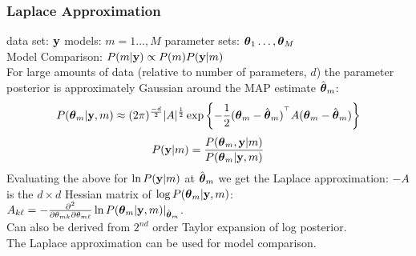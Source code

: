 \begin{frame}
\frametitle{Laplace Approximation}

\vspace*{-0.4\oin}
{\small data set: $\mathbf{y}$ \hspace{5mm} models: $m=1 \ldots,M$
\hspace{5mm} 
parameter sets: $\boldsymbol{\theta}_1 \ldots, \boldsymbol{\theta}_M$} \\

Model Comparison: \hspace{1\oin} $P(m|\mathbf{y}) \propto P(m)
P(\mathbf{y}|m) $ \\[1ex]

For large amounts of data (relative to number of parameters, $d$) the
parameter posterior is approximately Gaussian around the MAP estimate
$\hat{\boldsymbol{\theta}}_m$: 
\[
P(\boldsymbol{\theta}_m|\mathbf{y},m) \approx (2 \pi)^{\frac{-d}{2}}
|A|^{\frac{1}{2}} \exp \left \{ -\frac{1}{2} (\boldsymbol{\theta}_m - \hat{\boldsymbol{\theta}}_m)^{\scriptsize^{\top}} A
(\boldsymbol{\theta}_m - \hat{\boldsymbol{\theta}}_m) \right\}
\]
\[
P(\mathbf{y}|m) = \frac{P(\boldsymbol{\theta}_m, \mathbf{y}| m)}{P(\boldsymbol{\theta}_m|\mathbf{y},m)}
\]
Evaluating the above for $\ln P(\mathbf{y}|m)$ at
$\hat{\boldsymbol{\theta}}_m$ we get the Laplace approximation:
$-A$ is the $d\times d$ Hessian matrix of $\log
P(\boldsymbol{\theta}_m|\mathbf{y},m)$: 
$A_{k \ell }= -\frac{\partial^2}{\partial \theta_{m k}
  \partial \theta_{m \ell}} \ln P(\boldsymbol{\theta}_m|\mathbf{y},m) |_{\hat{\boldsymbol{\theta}}_m}$.\\[1ex]

Can also be derived from $2^{nd}$ order Taylor expansion of log
posterior. \\[1ex]
The Laplace approximation can be used for model comparison. 

\end{frame}
